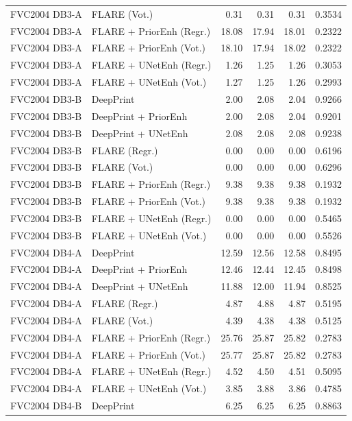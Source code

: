 {\begin{longtable}{llrrrr}
FVC2004 DB3-A & FLARE (Vot.) & 0.31 & 0.31 & 0.31 & 0.3534 \\
FVC2004 DB3-A & FLARE + PriorEnh (Regr.) & 18.08 & 17.94 & 18.01 & 0.2322 \\
FVC2004 DB3-A & FLARE + PriorEnh (Vot.) & 18.10 & 17.94 & 18.02 & 0.2322 \\
FVC2004 DB3-A & FLARE + UNetEnh (Regr.) & 1.26 & 1.25 & 1.26 & 0.3053 \\
FVC2004 DB3-A & FLARE + UNetEnh (Vot.) & 1.27 & 1.25 & 1.26 & 0.2993 \\
\midrule
FVC2004 DB3-B & DeepPrint & 2.00 & 2.08 & 2.04 & 0.9266 \\
FVC2004 DB3-B & DeepPrint + PriorEnh & 2.00 & 2.08 & 2.04 & 0.9201 \\
FVC2004 DB3-B & DeepPrint + UNetEnh & 2.08 & 2.08 & 2.08 & 0.9238 \\
FVC2004 DB3-B & FLARE (Regr.) & 0.00 & 0.00 & 0.00 & 0.6196 \\
FVC2004 DB3-B & FLARE (Vot.) & 0.00 & 0.00 & 0.00 & 0.6296 \\
FVC2004 DB3-B & FLARE + PriorEnh (Regr.) & 9.38 & 9.38 & 9.38 & 0.1932 \\
FVC2004 DB3-B & FLARE + PriorEnh (Vot.) & 9.38 & 9.38 & 9.38 & 0.1932 \\
FVC2004 DB3-B & FLARE + UNetEnh (Regr.) & 0.00 & 0.00 & 0.00 & 0.5465 \\
FVC2004 DB3-B & FLARE + UNetEnh (Vot.) & 0.00 & 0.00 & 0.00 & 0.5526 \\
\midrule
FVC2004 DB4-A & DeepPrint & 12.59 & 12.56 & 12.58 & 0.8495 \\
FVC2004 DB4-A & DeepPrint + PriorEnh & 12.46 & 12.44 & 12.45 & 0.8498 \\
FVC2004 DB4-A & DeepPrint + UNetEnh & 11.88 & 12.00 & 11.94 & 0.8525 \\
FVC2004 DB4-A & FLARE (Regr.) & 4.87 & 4.88 & 4.87 & 0.5195 \\
FVC2004 DB4-A & FLARE (Vot.) & 4.39 & 4.38 & 4.38 & 0.5125 \\
FVC2004 DB4-A & FLARE + PriorEnh (Regr.) & 25.76 & 25.87 & 25.82 & 0.2783 \\
FVC2004 DB4-A & FLARE + PriorEnh (Vot.) & 25.77 & 25.87 & 25.82 & 0.2783 \\
FVC2004 DB4-A & FLARE + UNetEnh (Regr.) & 4.52 & 4.50 & 4.51 & 0.5095 \\
FVC2004 DB4-A & FLARE + UNetEnh (Vot.) & 3.85 & 3.88 & 3.86 & 0.4785 \\
\midrule
FVC2004 DB4-B & DeepPrint & 6.25 & 6.25 & 6.25 & 0.8863 \\

\end{longtable}}
